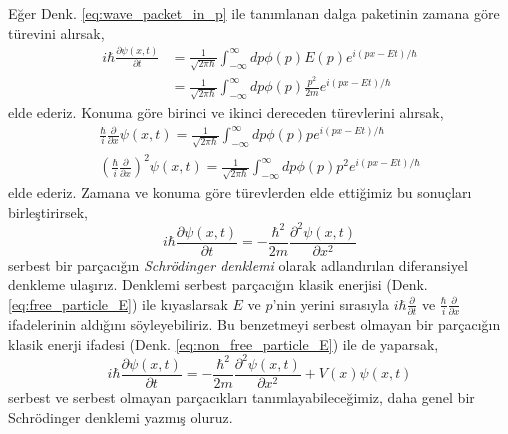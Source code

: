 \documentclass[a4paper,12pt, twoside]{article}
\begin{document}
Eğer Denk. \ref{eq:wave_packet_in_p} ile tanımlanan dalga paketinin zamana göre türevini alırsak,
\begin{align}
i \hbar \frac { \partial \psi ( x , t ) } { \partial t } &= \frac { 1 } { \sqrt { 2 \pi \hbar } } \int _ { - \infty } ^ { \infty } d p \phi ( p ) E ( p ) e ^ { i ( p x - E t) / \hbar } \nonumber\\
&= \frac { 1 } { \sqrt { 2 \pi \hbar } } \int _ { - \infty } ^ { \infty } d p \phi ( p ) \frac { p ^ { 2 } } { 2 m } e ^ { i ( p x - E t ) / \hbar }
\end{align}
elde ederiz. Konuma göre birinci ve ikinci dereceden türevlerini alırsak,
\begin{align}
\frac { \hbar } { i } \frac { \partial } { \partial x } \psi ( x , t ) = \frac { 1 } { \sqrt { 2 \pi \hbar } } \int _ { - \infty } ^ { \infty } d p \phi ( p ) p e ^ { i ( p x - E t )/\hbar }\nonumber\\
\left( \frac { \hbar } { i } \frac { \partial } { \partial x } \right) ^ { 2 } \psi ( x , t ) = \frac { 1 } { \sqrt { 2 \pi \hbar } } \int _ { - \infty } ^ { \infty } d p \phi ( p ) p ^ { 2 } e ^ { i ( p x - E t )/ \hbar }
\end{align}
elde ederiz. Zamana ve konuma göre türevlerden elde ettiğimiz bu sonuçları birleştirirsek,
\begin{equation}
i\hbar \dfrac {\partial \psi \left( x,t\right) }{\partial t}=-\dfrac {\hbar ^{2}}{2m}\dfrac {\partial ^{2}\psi \left( x,t\right) }{\partial x^{2}}
\label{eq:schrodinger_eq_free_particle}
\end{equation}
serbest bir parçacığın \emph{Schrödinger denklemi} olarak adlandırılan diferansiyel denkleme ulaşırız.
Denklemi serbest parçacığın klasik enerjisi (Denk. \ref{eq:free_particle_E}) ile kıyaslarsak $E$ ve $p$'nin yerini  sırasıyla $i \hbar \frac { \partial } { \partial t }$ ve $\frac{\hbar}{i} \frac { \partial } { \partial x }$ ifadelerinin aldığını söyleyebiliriz. Bu benzetmeyi serbest olmayan bir parçacığın klasik enerji ifadesi (Denk. \ref{eq:non_free_particle_E}) ile de yaparsak,
\begin{equation}
i\hbar \dfrac {\partial \psi \left( x,t\right) }{\partial t}=-\dfrac {\hbar ^{2}}{2m}\dfrac {\partial ^{2}\psi \left( x,t\right) }{\partial x^{2}}+V\left( x\right) \psi \left( x,t\right)
\label{eq:schrodinger_eq}
\end{equation}
serbest ve serbest olmayan parçacıkları tanımlayabileceğimiz, daha genel bir Schrödinger denklemi yazmış oluruz.
\end{document}
